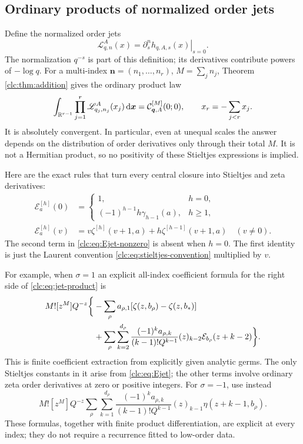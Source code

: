 \documentclass[11pt,a4paper]{article}
\numberwithin{equation}{section}
\theoremstyle{definition}\newtheorem{definition}[theorem]{Definition}
\theoremstyle{remark}\newtheorem{remark}[theorem]{Remark}
\newcommand{\dd}{\,\mathrm d}
\newcommand{\bq}{\boldsymbol q}\newcommand{\bs}{\boldsymbol s}
\newcommand{\CC}{\mathcal C}\newcommand{\UU}{\mathcal U}\newcommand{\EE}{\mathcal E}
\begin{document}
\subsection{Ordinary products of normalized order jets}
Define the normalized order jets
\begin{equation}\label{clc:eq:Ljet}
 \mathscr L_{q,n}^{A}(x)=
       \left.\partial_s^n h_{q,A,s}(x)\right|_{s=0}.
\end{equation}
The normalization $q^{-s}$ is part of this definition; its derivatives
contribute powers of $-\log q$. For a multi-index
$\boldsymbol n=(n_1,\ldots,n_r)$, $M=\sum_jn_j$, Theorem
\ref{clc:thm:addition} gives the ordinary product law
\begin{equation}\label{clc:eq:jet-product}
 \int_{\R^{r-1}}\prod_{j=1}^r\mathscr L_{q_j,n_j}^{A}(x_j)
                  \dd\boldsymbol x
 =\CC_{\bq,A}^{[M]}(0;0),\qquad x_r=-\sum_{j<r}x_j.
\end{equation}
It is absolutely convergent. In particular, even at unequal scales the
answer depends on the distribution of order derivatives only through
their total $M$. It is not a Hermitian product, so no positivity of
these Stieltjes expressions is implied.

Here are the exact rules that turn every central closure into Stieltjes
and zeta derivatives:
\begin{align}
 \EE_a^{[h]}(0)&=
 \begin{cases}1,&h=0,\\(-1)^{h-1}h\gamma_{h-1}(a),&h\ge1,
 \end{cases}\label{clc:eq:Ejet}\\
 \EE_a^{[h]}(v)&=v\zeta^{[h]}(v+1,a)
                +h\zeta^{[h-1]}(v+1,a)\quad(v\ne0).
 \label{clc:eq:Ejet-nonzero}
\end{align}
The second term in \eqref{clc:eq:Ejet-nonzero} is absent when $h=0$.
The first identity is just the Laurent convention
\eqref{clc:eq:stieltjes-convention} multiplied by $v$.

For example, when $\sigma=1$ an explicit all-index coefficient formula
for the right side of \eqref{clc:eq:jet-product} is
\begin{align}
 M![z^M]Q^{-z}\biggl\{&-\sum_\rho a_{\rho,1}
         [\zeta(z,b_\rho)-\zeta(z,b_*)]\notag\\
 &+\sum_\rho\sum_{k=2}^{d_\rho}
 \frac{(-1)^ka_{\rho,k}}{(k-1)!Q^{k-1}}
      (z)_{k-2}\EE_{b_\rho}(z+k-2)\biggr\}.
 \label{clc:eq:alljet-coeff}
\end{align}
This is finite coefficient extraction from explicitly given analytic
germs. The only Stieltjes constants in it arise from
\eqref{clc:eq:Ejet}; the other terms involve ordinary zeta order
derivatives at zero or positive integers. For $\sigma=-1$, use instead
\begin{equation}\label{clc:eq:alljet-eta}
 M![z^M]Q^{-z}\sum_\rho\sum_{k=1}^{d_\rho}
 \frac{(-1)^ka_{\rho,k}}{(k-1)!Q^{k-1}}
             (z)_{k-1}\eta(z+k-1,b_\rho).
\end{equation}
These formulas, together with finite product differentiation, are
explicit at every index; they do not require a recurrence fitted to
low-order data.
\end{document}
